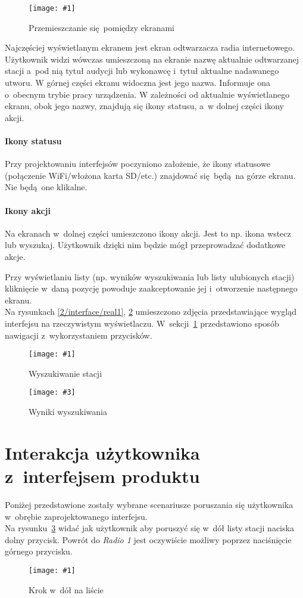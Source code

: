 \documentclass[polish]{aghengthesis}
\newcommand{\imgint}[4]{
	\begin{figure}[{#4}]
		\centering
		\texttt{[image: \#1]}
		\caption{#2}
		\label{#1}
	\end{figure}
}
\newcommand{\imgh}[3]{\imgint{#1}{#2}{#3}{H}}
\newcommand{\imgintss}[5]{
	\begin{figure}[{#5}]
		\centering
		\begin{minipage}{.45\textwidth}
			\centering
			\texttt{[image: \#1]}
			\caption{#2}
			\label{#1}
		\end{minipage}%
		\hfill
		\begin{minipage}{.45\textwidth}
			\centering
			\texttt{[image: \#3]}
			\caption{#4}
			\label{#3}
		\end{minipage}
	\end{figure}
}
\newcommand{\imghss}[4]{\imgintss{#1}{#2}{#3}{#4}{H}}
\begin{document}
		\imgh{2/interface/all}{Przemieszczanie się pomiędzy ekranami}{0.9}
		
		Najczęściej wyświetlanym ekranem jest ekran odtwarzacza radia internetowego. Użytkownik widzi wówczas umieszczoną na ekranie nazwę aktualnie odtwarzanej stacji a~pod nią tytuł audycji lub wykonawcę i~tytuł aktualne nadawanego utworu.
		W górnej części ekranu widoczna jest jego nazwa. Informuje ona o~obecnym trybie pracy urządzenia.
		W zależności od aktualnie wyświetlanego ekranu, obok jego nazwy, znajdują się ikony statusu, a~w dolnej części ikony akcji.
		
		\paragraph{Ikony statusu}
			Przy projektowaniu interfejsów poczyniono założenie, że ikony statusowe (połączenie WiFi/włożona karta SD/etc.) znajdować się będą na górze ekranu. Nie będą one klikalne.
			
		\paragraph{Ikony akcji}
			Na ekranach w~dolnej części umieszczono ikony akcji. Jest to np. ikona wstecz lub wyszukaj. Użytkownik dzięki nim będzie mógł przeprowadzać dodatkowe akcje.
		
		$ $\\
		Przy wyświetlaniu listy (np. wyników wyszukiwania lub listy ulubionych stacji) kliknięcie w~daną pozycję powoduje zaakceptowanie jej i~otworzenie następnego ekranu.
		$ $\\
		
		Na rysunkach \ref{2/interface/real1}, \ref{2/interface/real2} umieszczono zdjęcia przedstawiające wygląd interfejsu na rzeczywistym wyświetlaczu. W~sekcji~\ref{sec:uinav} przedstawiono sposób nawigacji z~wykorzystaniem przycisków.
		\imghss{2/interface/real1}{Wyszukiwanie stacji}{2/interface/real2}{Wyniki wyszukiwania}
	
	\section{Interakcja użytkownika z~interfejsem produktu}
		\label{sec:uinav}
		Poniżej przedstawione zostały wybrane scenariusze poruszania się użytkownika w~obrębie zaprojektowanego interfejsu.
		$ $\\
		
		Na rysunku~\ref{2/btn/1} widać jak użytkownik aby poruszyć się w~dół listy stacji naciska dolny przycisk. Powrót do \textit{Radio 1} jest oczywiście możliwy poprzez naciśnięcie górnego przycisku.
		\imgh{2/btn/1}{Krok w~dół na liście}{0.7}
		
\end{document}
